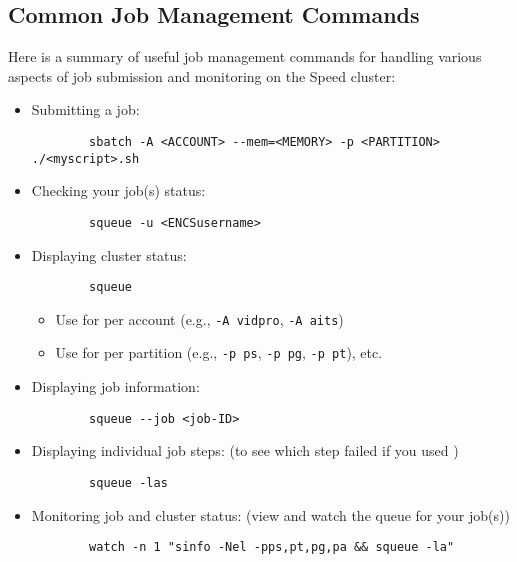 \subsection{Common Job Management Commands}
\label{sect:job-management-commands}

Here is a summary of useful job management commands for handling various aspects of
job submission and monitoring on the Speed cluster:

\begin{itemize}
    \item Submitting a job:
	\begin{verbatim}
		sbatch -A <ACCOUNT> --mem=<MEMORY> -p <PARTITION> ./<myscript>.sh
	\end{verbatim}

	\item Checking your job(s) status:
	\begin{verbatim}
		squeue -u <ENCSusername>
	\end{verbatim}

	\item Displaying cluster status:
	\begin{verbatim}
		squeue
	\end{verbatim}
		\begin{itemize}
			\item Use  for per account (e.g., \texttt{-A vidpro}, \texttt{-A aits})
			\item Use  for per partition (e.g., \texttt{-p ps}, \texttt{-p pg}, \texttt{-p pt}), etc.
		\end{itemize}

	\item Displaying job information:
	\begin{verbatim}
		squeue --job <job-ID>
	\end{verbatim}

	\item Displaying individual job steps: (to see which step failed if you used )
	\begin{verbatim}
		squeue -las
	\end{verbatim}

	\item Monitoring job and cluster status: (view  and watch the queue for your job(s))
	\begin{verbatim}
		watch -n 1 "sinfo -Nel -pps,pt,pg,pa && squeue -la"
	\end{verbatim}


\end{itemize}
